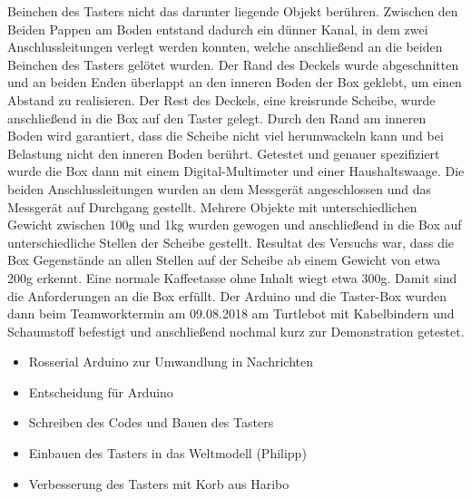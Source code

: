 \documentclass[a4paper,12pt,headsepline]{scrartcl}
\begin{document}
Beinchen des Tasters nicht das darunter liegende Objekt berühren. Zwischen den Beiden Pappen am Boden entstand dadurch ein dünner Kanal, in dem zwei Anschlussleitungen verlegt werden konnten, welche anschließend an die beiden Beinchen des Tasters gelötet wurden. Der Rand des Deckels wurde abgeschnitten und an beiden Enden überlappt an den inneren Boden der Box geklebt, um einen Abstand zu realisieren. Der Rest des Deckels, eine kreisrunde Scheibe, wurde anschließend in die Box auf den Taster gelegt. Durch den Rand am inneren Boden wird garantiert, dass die Scheibe nicht viel herumwackeln kann und bei Belastung nicht den inneren Boden berührt. Getestet und genauer spezifiziert wurde die Box dann mit einem Digital-Multimeter und einer Haushaltswaage. Die beiden Anschlussleitungen wurden an dem Messgerät angeschlossen und das Messgerät auf Durchgang gestellt. Mehrere Objekte mit unterschiedlichen Gewicht zwischen 100g und 1kg wurden gewogen und anschließend in die Box auf unterschiedliche Stellen der Scheibe gestellt. Resultat des Versuchs war, dass die Box Gegenstände an allen Stellen auf der Scheibe ab einem Gewicht von etwa 200g erkennt. Eine normale Kaffeetasse ohne Inhalt wiegt etwa 300g. Damit sind die Anforderungen an die Box erfüllt. Der Arduino und die Taster-Box wurden dann beim Teamworktermin am 09.08.2018 am Turtlebot mit Kabelbindern und Schaumstoff befestigt und anschließend nochmal kurz zur Demonstration getestet.
		\begin{itemize}
			\item Rosserial Arduino zur Umwandlung in Nachrichten
			\item Entscheidung für Arduino
			\item Schreiben des Codes und Bauen des Tasters
			\item Einbauen des Tasters in das Weltmodell (Philipp)
			\item Verbesserung des Tasters mit Korb aus Haribo
		\end{itemize}
	
\end{document}
